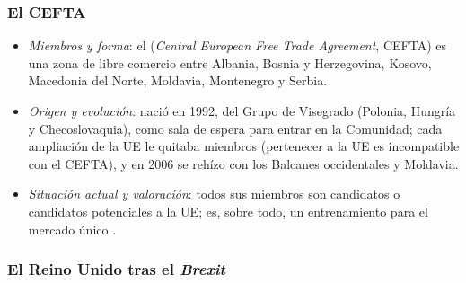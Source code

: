 \documentclass[11pt]{article}
\begin{document}
\subsubsection{El CEFTA}\label{sec:cefta}

\begin{itemize}
\item \emph{Miembros y forma}: el  (\emph{Central European Free Trade Agreement}, CEFTA) es una zona de libre comercio entre Albania, Bosnia y Herzegovina, Kosovo, Macedonia del Norte, Moldavia, Montenegro y Serbia.
\item \emph{Origen y evolución}: nació en 1992, del Grupo de Visegrado (Polonia, Hungría y Checoslovaquia), como sala de espera para entrar en la Comunidad; cada ampliación de la UE le quitaba miembros (pertenecer a la UE es incompatible con el CEFTA), y en 2006 se rehízo con los Balcanes occidentales y Moldavia.
\item \emph{Situación actual y valoración}: todos sus miembros son candidatos o candidatos potenciales a la UE; es, sobre todo, un entrenamiento para el mercado único .
\end{itemize}

\subsubsection{El Reino Unido tras el \emph{Brexit}}\label{sec:reino-unido}
\end{document}
